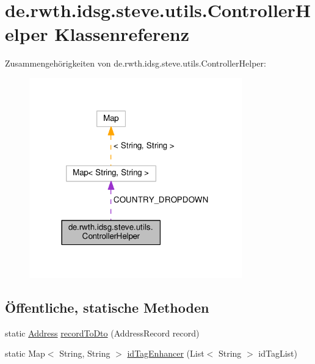 \hypertarget{classde_1_1rwth_1_1idsg_1_1steve_1_1utils_1_1_controller_helper}{\section{de.\+rwth.\+idsg.\+steve.\+utils.\+Controller\+Helper Klassenreferenz}
\label{classde_1_1rwth_1_1idsg_1_1steve_1_1utils_1_1_controller_helper}
}


Zusammengehörigkeiten von de.\+rwth.\+idsg.\+steve.\+utils.\+Controller\+Helper\+:\nopagebreak
\begin{figure}[H]
\begin{center}
\leavevmode
\includegraphics[width=261pt]{classde_1_1rwth_1_1idsg_1_1steve_1_1utils_1_1_controller_helper__coll__graph}
\end{center}
\end{figure}
\subsection*{Öffentliche, statische Methoden}
\begin{DoxyCompactItemize}
\item 
static \hyperlink{classde_1_1rwth_1_1idsg_1_1steve_1_1web_1_1dto_1_1_address}{Address} \hyperlink{classde_1_1rwth_1_1idsg_1_1steve_1_1utils_1_1_controller_helper_a49bb49e4372a76b9ff9f12706c8aa548}{record\+To\+Dto} (Address\+Record record)
\item 
static Map$<$ String, String $>$ \hyperlink{classde_1_1rwth_1_1idsg_1_1steve_1_1utils_1_1_controller_helper_a30c039cffd35900ddc93ebfdd5f23c22}{id\+Tag\+Enhancer} (List$<$ String $>$ id\+Tag\+List)
\end{DoxyCompactItemize}
